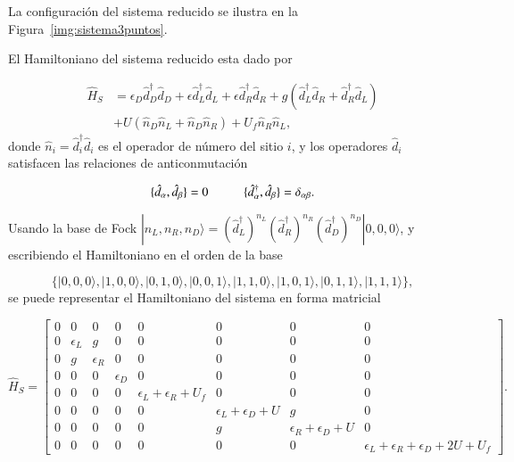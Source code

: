 La configuración del sistema reducido se ilustra en la Figura~\ref{img:sistema3puntos}.



El Hamiltoniano del sistema reducido esta dado por 

\begin{align*}
    \hat{H}_{S} & = \epsilon_{D}\hat{d}^{\dagger}_{D}\hat{d}_{D} + \epsilon \hat{d}^{\dagger}_{L}\hat{d}_{L} + \epsilon \hat{d}^{\dagger}_{R}\hat{d}_{R} + g(\hat{d}^{\dagger}_{L}\hat{d}_{R} + \hat{d}^{\dagger}_{R}\hat{d}_{L} ) \\
          & + U(\hat{n}_{D}\hat{n}_{L} + \hat{n}_{D}\hat{n}_{R} )  + U_{f}\hat{n}_{R}\hat{n}_{L},
\end{align*}
donde $\hat{n}_{i} = \hat{d}^{\dagger}_{i} \hat{d}_{i}$ es el operador de número del sitio $i$, y los operadores $\hat{d}_{i}$ satisfacen las relaciones de anticonmutación

\begin{equation*}
    \{\hat{d}_{\alpha},\hat{d}_{\beta} \} = 0  \hspace{10mm} \{\hat{d}^{\dagger}_{\alpha}, \hat{d}_{\beta} \} = \delta_{\alpha \beta}.
\end{equation*}

Usando la base de Fock $|n_{L},n_{R},n_{D} \rangle = (\hat{d}^{\dagger}_{L})^{n_{L}}(\hat{d}^{\dagger}_{R})^{n_{R}}(\hat{d}^{\dagger}_{D})^{n_{D}}|0,0,0\rangle$, y escribiendo el Hamiltoniano en el orden de la base 

\begin{equation*}
     \{|0,0,0\rangle, |1,0,0\rangle, |0,1,0\rangle, |0,0,1\rangle, |1,1,0\rangle, |1,0,1\rangle, |0,1,1\rangle, |1,1,1\rangle\},
\end{equation*}
se puede representar el Hamiltoniano del sistema en forma matricial 

\begin{equation*}
    \hat{H}_{S} = 
    \begin{bmatrix}
        0 & 0 & 0 & 0 & 0 & 0 & 0 & 0 \\
        0 & \epsilon_{L} & g & 0 & 0 & 0 & 0 & 0 \\
        0 & g & \epsilon_{R} & 0 & 0 & 0 & 0 & 0 \\
        0 & 0 & 0 & \epsilon_{D} & 0 & 0 & 0 & 0 \\
        0 & 0 & 0 & 0 & \epsilon_{L} + \epsilon_{R}  + U_{f} & 0 & 0 & 0 \\
        0 & 0 & 0 & 0 & 0 & \epsilon_{L} + \epsilon_{D} + U & g & 0 \\
        0 & 0 & 0 & 0 & 0 & g & \epsilon_{R} + \epsilon_{D} + U & 0 \\
        0 & 0 & 0 & 0 & 0 & 0 & 0 & \epsilon_{L} + \epsilon_{R}  + \epsilon_{D} + 2U + U_{f} 
        \end{bmatrix}.
\end{equation*}

